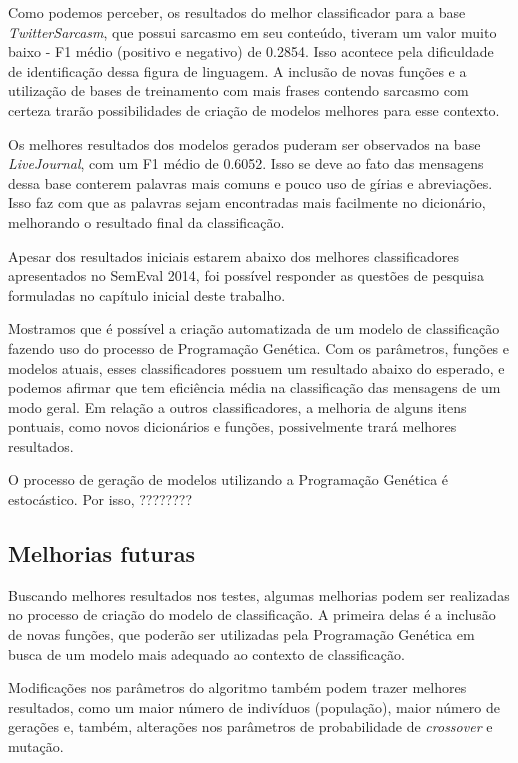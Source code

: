 \documentclass[12pt]{article}
\begin{document}
Como podemos perceber, os resultados do melhor classificador para a base \emph{TwitterSarcasm}, que possui sarcasmo em seu conteúdo, tiveram um valor muito baixo - F1 médio (positivo e negativo) de 0.2854. Isso acontece pela dificuldade de identificação dessa figura de linguagem. A inclusão de novas funções e a utilização de bases de treinamento com mais frases contendo sarcasmo com certeza trarão possibilidades de criação de modelos melhores para esse contexto.

Os melhores resultados dos modelos gerados puderam ser observados na base \emph{LiveJournal}, com um F1 médio de 0.6052. Isso se deve ao fato das mensagens dessa base conterem palavras mais comuns e pouco uso de gírias e abreviações. Isso faz com que as palavras sejam encontradas mais facilmente no dicionário, melhorando o resultado final da classificação.

Apesar dos resultados iniciais estarem abaixo dos melhores classificadores apresentados no SemEval 2014, foi possível responder as questões de pesquisa formuladas no capítulo inicial deste trabalho. 

Mostramos que é possível a criação automatizada de um modelo de classificação fazendo uso do processo de Programação Genética. Com os parâmetros, funções e modelos atuais, esses classificadores possuem um resultado abaixo do esperado, e podemos afirmar que tem eficiência média na classificação das mensagens de um modo geral. Em relação a outros classificadores, a melhoria de alguns itens pontuais, como novos dicionários e funções, possivelmente trará melhores resultados.


O processo de geração de modelos utilizando a Programação Genética é estocástico. Por isso, ????????

\subsection{Melhorias futuras}

Buscando melhores resultados nos testes, algumas melhorias podem ser realizadas no processo de criação do modelo de classificação. A primeira delas é a inclusão de novas funções, que poderão ser utilizadas pela Programação Genética em busca de um modelo mais adequado ao contexto de classificação. 

Modificações nos parâmetros do algoritmo também podem trazer melhores resultados, como um maior número de indivíduos (população), maior número de gerações e, também, alterações nos parâmetros de probabilidade de \emph{crossover} e mutação.
\end{document}
